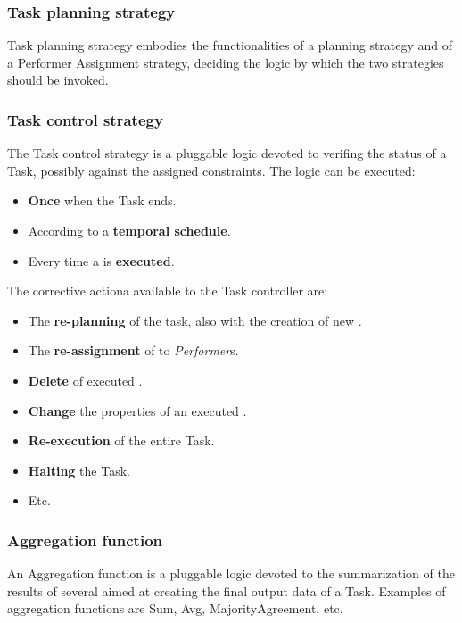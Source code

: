 \subsubsection{Task planning strategy}
Task planning strategy embodies the functionalities of a \utask{} planning
strategy and of a Performer Assignment strategy, deciding the logic by which the
two strategies should be invoked.



\subsubsection{Task control strategy}
The Task control strategy is a pluggable logic devoted to verifing the status of
a Task, possibly against the assigned constraints. The logic can be executed:
\begin{itemize}
    \item \textbf{Once} when the Task ends.

    \item According to a \textbf{temporal schedule}. %

    \item Every time a \utask{} is \textbf{executed}.
\end{itemize}
The corrective actiona available to the Task controller are: 
\begin{itemize}
    \item The \textbf{re-planning} of the task, also with the creation of new
    \utask{}.

    \item The \textbf{re-assignment} of \utask{} to \emph{Performer}s.

    \item \textbf{Delete} of executed \utask{}.

    \item \textbf{Change} the properties of an executed \utask{}.

    \item \textbf{Re-execution} of the entire Task.

    \item \textbf{Halting} the Task.

    \item Etc.
\end{itemize}



\subsubsection{Aggregation function}
An Aggregation function is a pluggable logic devoted to the summarization of the
results of several \utask{} aimed at creating the final output data of a Task.
Examples of aggregation functions are Sum, Avg, MajorityAgreement, etc.


